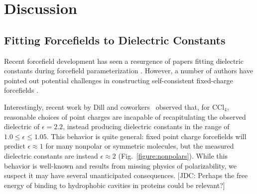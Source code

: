 \documentclass[aps,pre,twocolumn,nofootinbib,superscriptaddress,linenumbers]{revtex4-1}
\begin{document}

\section{Discussion}


\subsection{Fitting Forcefields to Dielectric Constants}

Recent forcefield development has seen a resurgence of papers fitting dielectric constants during forcefield parameterization \cite{wang2014building, fennell2014fixed}.  
However, a number of authors have pointed out potential challenges in constructing self-consistent fixed-charge forcefields \cite{fennell2012simple, leontyev2014polarizable}.  

Interestingly, recent work by Dill and coworkers~\cite{fennell2012simple} observed that, for $\mathrm{CCl_4}$, reasonable choices of point charges are incapable of recapitulating the observed dielectric of $\epsilon = 2.2$, instead producing dielectric constants in the range of $1.0 \le \epsilon \le 1.05$.  
This behavior is quite general: fixed point charge forcefields will predict $\epsilon \approx 1$ for many nonpolar or symmetric molecules, but the measured dielectric constants are instead $\epsilon \approx 2$ (Fig.~\ref{figure:nonpolars}).  
While this behavior is well-known and results from missing physics of polarizability, we suspect it may have several unanticipated consequences.
{\color{red}[JDC: Perhaps the free energy of binding to hydrophobic cavities in proteins could be relevant?]}

\end{document}
